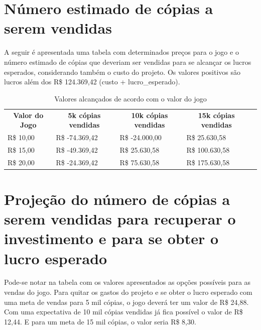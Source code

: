 \documentclass[a4paper,11pt]{article}
\begin{document}
\section{Número estimado de cópias a serem vendidas}

A seguir é apresentada uma tabela com determinados preços para o jogo e o número estimado de cópias que deveriam ser vendidas para se alcançar os lucros esperados, considerando também o custo do projeto. Os valores positivos são lucros além dos R\$ 124.369,42 (custo + lucro\_esperado). 

\begin{table}[h]
\begin{tabular}{|l|l|l|l|l}
\cline{1-4}
\multicolumn{1}{|c|}{\textbf{Valor do Jogo}} & \multicolumn{1}{c|}{\textbf{5k cópias vendidas}} & \multicolumn{1}{c|}{\textbf{10k cópias vendidas}} & \multicolumn{1}{c|}{\textbf{15k cópias vendidas}} &  \\ \cline{1-4}
R\$ 10,00                                    & R\$ -74.369,42                                        & R\$ -24.000,00                                        & R\$ 25.630,58                                     &  \\ \cline{1-4}
R\$ 15,00                                    & R\$ -49.369,42                                        & R\$ 25.630,58                                        & R\$ 100.630,58                                     &  \\ \cline{1-4}
R\$ 20,00                                    & R\$ -24.369,42                                       & R\$ 75.630,58                                        & R\$ 175.630,58                                     &  \\ \cline{1-4}
\end{tabular}
\caption{Valores alcançados de acordo com o valor do jogo}
\end{table}

\section{Projeção do número de cópias a serem vendidas para recuperar o
	    investimento e para se obter o lucro esperado}

Pode-se notar na tabela com os valores apresentados as opções possíveis para as vendas do jogo. Para quitar os gastos do projeto e se obter o lucro esperado com uma meta de vendas para 5 mil cópias, o jogo deverá ter um valor de R\$ 24,88. Com uma expectativa de 10 mil cópias vendidas já fica possível o valor de R\$ 12,44. E para um meta de 15 mil cópias, o valor seria R\$ 8,30.
\end{document}
